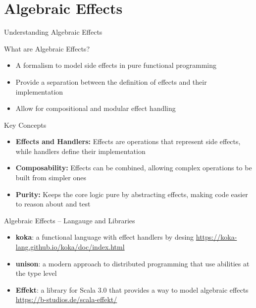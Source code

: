 \documentclass[presentation, 10pt]{beamer}\mode<presentation>{\usetheme{metropolis}}
\begin{document}
\section{Algebraic Effects}
\begin{frame}{Understanding Algebraic Effects}
	\begin{exampleblock}{What are Algebraic Effects?}
		\begin{itemize}
			\item A formalism to model side effects in pure functional programming
			\item Provide a separation between the definition of effects and their implementation
			\item Allow for compositional and modular effect handling
		\end{itemize}
	\end{exampleblock}

	\begin{alertblock}{Key Concepts}
		\begin{itemize}
			\item \textbf{Effects and Handlers:} Effects are operations that represent side effects, while handlers define their implementation
			\item \textbf{Composability:} Effects can be combined, allowing complex operations to be built from simpler ones
			\item \textbf{Purity:} Keeps the core logic pure by abstracting effects, making code easier to reason about and test
		\end{itemize}
	\end{alertblock}
\end{frame}
\begin{frame}{Algebraic Effects -- Langauge and Libraries}
\begin{itemize}
	\item \textbf{koka}: a functional language with effect handlers by desing \url{https://koka-lang.github.io/koka/doc/index.html}
	\item \textbf{unison}: a modern approach to distributed programming that use abilities at the type level
	\item \textbf{Effekt}: a library for Scala 3.0 that provides a way to model algebraic effects \url{https://b-studios.de/scala-effekt/}
\end{itemize}
\end{frame}
\end{document}
